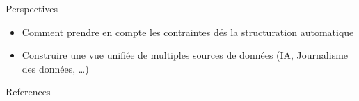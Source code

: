 \documentclass[english,french,table,aspectratio=43]{beamer}
\renewcommand{\_}{\ifincsname_\else\legacyunderscore\fi}
\begin{document}

%

\begin{frame}{Perspectives}
    \vfill
    \begin{itemize}
        \item Comment prendre en compte les contraintes dés la structuration automatique
        \vfill
        \item Construire une vue unifiée de multiples sources de données (IA, Journalisme des données, \dots)
    \end{itemize}
    \vfill
\end{frame}

\frame{\titlepage}

\begin{frame}[allowframebreaks]{References}
    
    
\end{frame}
\end{document}
